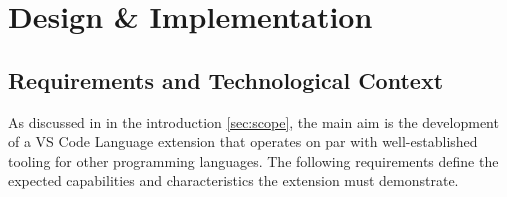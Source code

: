 \part{Design \& Implementation}

\chapter{Requirements and Technological Context}

As discussed in in the introduction \ref{sec:scope}, the main aim is the development of a VS Code Language extension that operates on par with
well-established tooling for other programming languages. The following requirements define the expected capabilities and characteristics the extension must demonstrate.


